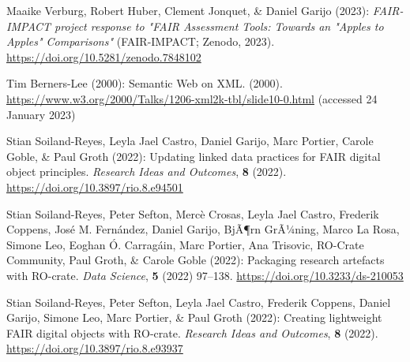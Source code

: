 \begin{thebibliography}{9}
Maaike Verburg, Robert Huber, Clement Jonquet, \& Daniel Garijo (2023):
\emph{{FAIR-IMPACT project response to "FAIR Assessment Tools: Towards
an "Apples to Apples" Comparisons"}} ({FAIR-IMPACT}; Zenodo, 2023).
\url{https://doi.org/10.5281/zenodo.7848102}

Tim Berners-Lee (2000): {Semantic Web on XML}. (2000).
\url{https://www.w3.org/2000/Talks/1206-xml2k-tbl/slide10-0.html}
(accessed 24 January 2023)

Stian Soiland-Reyes, Leyla Jael Castro, Daniel Garijo, Marc Portier,
Carole Goble, \& Paul Groth (2022): Updating linked data practices for
{FAIR} digital object principles. \emph{Research Ideas and Outcomes},
\textbf{8} (2022).
\url{https://doi.org/10.3897/rio.8.e94501}

Stian Soiland-Reyes, Peter Sefton, Mercè Crosas, Leyla Jael Castro,
Frederik Coppens, José M. Fernández, Daniel Garijo, BjÃ¶rn GrÃ¼ning,
Marco La Rosa, Simone Leo, Eoghan Ó. Carragáin, Marc Portier, Ana
Trisovic, RO-Crate Community, Paul Groth, \& Carole Goble (2022):
Packaging research artefacts with {RO}-crate. \emph{Data Science},
\textbf{5} (2022) 97--138.
\url{https://doi.org/10.3233/ds-210053}

Stian Soiland-Reyes, Peter Sefton, Leyla Jael Castro, Frederik Coppens,
Daniel Garijo, Simone Leo, Marc Portier, \& Paul Groth (2022): Creating
lightweight {FAIR} digital objects with {RO}-crate. \emph{Research Ideas
and Outcomes}, \textbf{8} (2022).
\url{https://doi.org/10.3897/rio.8.e93937}



\end{thebibliography}